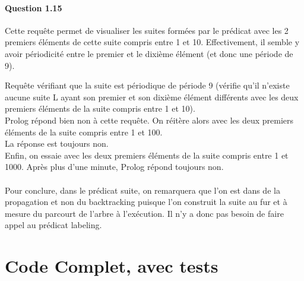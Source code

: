 \documentclass[11pt]{article} %
\begin{document}
\paragraph{Question 1.15}
Cette requête permet de visualiser les suites formées par le prédicat avec les 2 premiers
éléments de cette suite compris entre 1 et 10. Effectivement, il semble y avoir périodicité entre le premier
et le dixième élément (et donc une période de 9).

Requête vérifiant que la suite est périodique de période 9
(vérifie qu'il n'existe aucune suite L ayant son premier et son dixième élément différents avec les deux premiers
éléments de la suite compris entre 1 et 10).\\
Prolog répond bien non à cette requête. On réitère alors avec les deux premiers éléments de la suite compris
entre 1 et 100.\\
La réponse est toujours non.\\
Enfin, on essaie avec les deux premiers éléments de la suite compris entre 1 et 1000.
Après plus d'une minute, Prolog répond toujours non.\\\\
Pour conclure, dans le prédicat suite, on remarquera que l'on est dans de la propagation et non du backtracking
puisque l'on construit la suite au fur et à mesure du parcourt de l'arbre à l'exécution.
Il n'y a donc pas besoin de faire appel au prédicat labeling.
\newpage

\section{Code Complet, avec tests}

\end{document}
